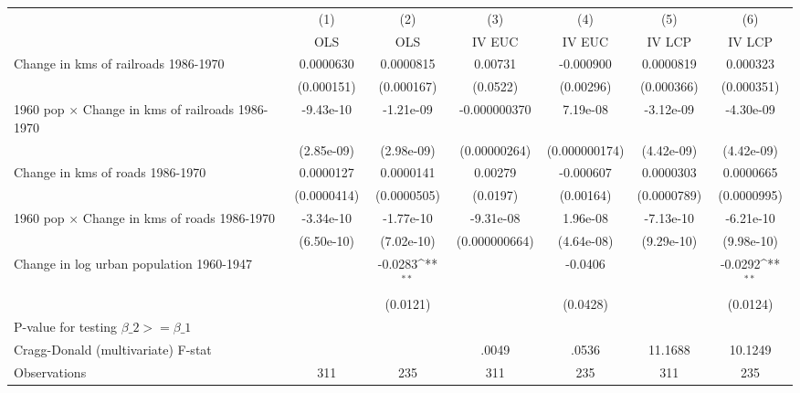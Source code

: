 {
\def\sym#1{\ifmmode^{#1}\else\(^{#1}\)\fi}
\begin{tabular}{l*{6}{c}}
\hline\hline
                &\multicolumn{1}{c}{(1)}&\multicolumn{1}{c}{(2)}&\multicolumn{1}{c}{(3)}&\multicolumn{1}{c}{(4)}&\multicolumn{1}{c}{(5)}&\multicolumn{1}{c}{(6)}\\
                &\multicolumn{1}{c}{OLS}&\multicolumn{1}{c}{OLS}&\multicolumn{1}{c}{IV EUC}&\multicolumn{1}{c}{IV EUC}&\multicolumn{1}{c}{IV LCP}&\multicolumn{1}{c}{IV LCP}\\
\hline
Change in kms of railroads 1986-1970&0.0000630         &0.0000815         &  0.00731         &-0.000900         &0.0000819         & 0.000323         \\
                &(0.000151)         &(0.000167)         & (0.0522)         &(0.00296)         &(0.000366)         &(0.000351)         \\
[1em]
1960 pop $\times$ Change in kms of railroads 1986-1970&-9.43e-10         &-1.21e-09         &-0.000000370         & 7.19e-08         &-3.12e-09         &-4.30e-09         \\
                &(2.85e-09)         &(2.98e-09)         &(0.00000264)         &(0.000000174)         &(4.42e-09)         &(4.42e-09)         \\
[1em]
Change in kms of roads 1986-1970&0.0000127         &0.0000141         &  0.00279         &-0.000607         &0.0000303         &0.0000665         \\
                &(0.0000414)         &(0.0000505)         & (0.0197)         &(0.00164)         &(0.0000789)         &(0.0000995)         \\
[1em]
1960 pop $\times$ Change in kms of roads 1986-1970&-3.34e-10         &-1.77e-10         &-9.31e-08         & 1.96e-08         &-7.13e-10         &-6.21e-10         \\
                &(6.50e-10)         &(7.02e-10)         &(0.000000664)         &(4.64e-08)         &(9.29e-10)         &(9.98e-10)         \\
[1em]
Change in log urban population 1960-1947&                  &  -0.0283\sym{**} &                  &  -0.0406         &                  &  -0.0292\sym{**} \\
                &                  & (0.0121)         &                  & (0.0428)         &                  & (0.0124)         \\
\hline
P-value for testing $\beta\_{2} >= \beta\_{1}$&                  &                  &                  &                  &                  &                  \\
Cragg-Donald (multivariate) F-stat&                  &                  &    .0049         &    .0536         &  11.1688         &  10.1249         \\
Observations    &      311         &      235         &      311         &      235         &      311         &      235         \\
\hline\hline
\end{tabular}
}
